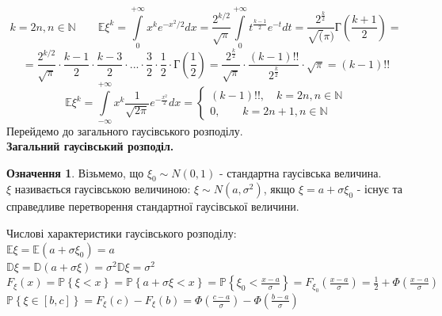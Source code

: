 \documentclass[14pt,a4paper]{scrartcl}
\theoremstyle{definition}
\newtheorem*{defo}{Означення}
\theoremstyle{remark}
\theoremstyle{definition}
\theoremstyle{definition}
\begin{document}
$$
k = 2n, n\in \mathbb{N} \qquad \mathbb{E} \xi^k =   \int\limits_{0}^{ +\infty}{ x^k e^ { -x^2/2 }dx} = \frac{2^{k/2}}{\sqrt{\pi}}  \int\limits_{0}^{ +\infty}{ t^ { \frac{k-1}{2}  } e^{-t} dt} = \frac{2^ \frac{k}{2} }{ \sqrt(\pi) } \text{Г} ( \frac{k+1}{2} ) =
$$
$$
= \frac{2^ {k/2}}{\sqrt{\pi}} \cdot \frac{k-1}{2} \cdot \frac{k-3}{2}  \cdot ... \cdot \frac{3}{2} \cdot \frac{1}{2} \cdot \text{Г} ( \frac{1}{2} )= \frac{2^{ \frac{k}{2} }}{\sqrt{\pi}}\cdot \frac{(k-1)!!}{ 2^{ \frac{k}{2} }} \cdot \sqrt{\pi} = (k-1)!!
$$
$$
\mathbb{E} \xi ^k =   \int\limits_{-\infty}^{ +\infty}{ x^k \frac{1}{ \sqrt{2 \pi}} e ^ { - \frac{x^2}{2} } dx} = \left\lbrace \begin{gathered}
 (k-1)!! ,\quad k = 2n, n \in \mathbb{N}\\
 0 ,\qquad k = 2n+ 1, n \in \mathbb{N}
\end{gathered} \right.
$$
Перейдемо до загального гаусівського розподілу.\\
\textbf{Загальний гаусівський розподіл.}
\begin{defo}
Візьмемо, що $\xi_0 \sim N(0, 1)$ - стандартна гаусівська величина. \\
$\xi$ називається гаусівською величиною: $ \xi \sim N(a, \sigma^2)$, якщо $ \xi = a + \sigma \xi_0$ - існує та справедливе перетворення стандартної гаусівської величини.
\end{defo}
Числові характеристики гаусівського розподілу:\\
$\mathbb{E} \xi = \mathbb{E}(a + \sigma \xi_0) = a$\\
$\mathbb{D} \xi = \mathbb{D} (a + \sigma \xi) = \sigma^2 \mathbb{D} \xi = \sigma^2$\\
$ F_ \xi (x) = \mathbb{P} \left\lbrace \xi <x \right\rbrace = \mathbb{P} \left\lbrace a + \sigma\xi  < x \right\rbrace = \mathbb{P} \left\lbrace \xi_0 < \frac{x-a}{ \sigma}  \right\rbrace = F_ { \xi_0}( \frac{x-a}{\sigma} 	) = \frac{1}{2} + \Phi ( \frac{x-a}{\sigma} ) $ \\
$\mathbb{P} \left\lbrace  \xi \in [b,c] \right\rbrace = F_ \xi (c) - F_ \xi (b) = \Phi( \frac{c-a}{\sigma} ) - \Phi( \frac{b-a}{\sigma} )$\\
\end{document}
